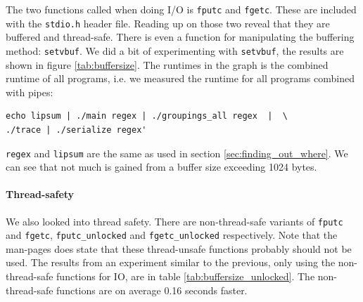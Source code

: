 The two functions called when doing I/O is \lstinline{fputc} and
\lstinline{fgetc}. These are included with the \texttt{stdio.h} header
file. Reading up on those two reveal that they are buffered and
thread-safe. There is even a function for manipulating the buffering
method: \lstinline{setvbuf}. We did a bit of experimenting with
\lstinline{setvbuf}, the results are shown in figure
\vref{tab:buffersize}. The runtimes in the graph is the combined
runtime of all programs, i.e. we measured the runtime for all programs
combined with pipes:
\begin{verbatim}
echo lipsum | ./main regex | ./groupings_all regex  |  \
./trace | ./serialize regex'
\end{verbatim}
\texttt{regex} and \texttt{lipsum} are the same as used in section
\vref{sec:finding_out_where}. We can see that not much is gained from
a buffer size exceeding 1024 bytes.

\paragraph{Thread-safety}
We also looked into thread safety. There are non-thread-safe variants of
\lstinline{fputc} and \lstinline{fgetc}, \lstinline{fputc_unlocked}
and \lstinline{fgetc_unlocked} respectively. Note that the man-pages
does state that these thread-unsafe functions probably should not be
used. The results from an experiment similar to the previous, only
using the non-thread-safe functions for IO, are in table
\vref{tab:buffersize_unlocked}. The non-thread-safe functions are on
average 0.16 seconds faster. 





